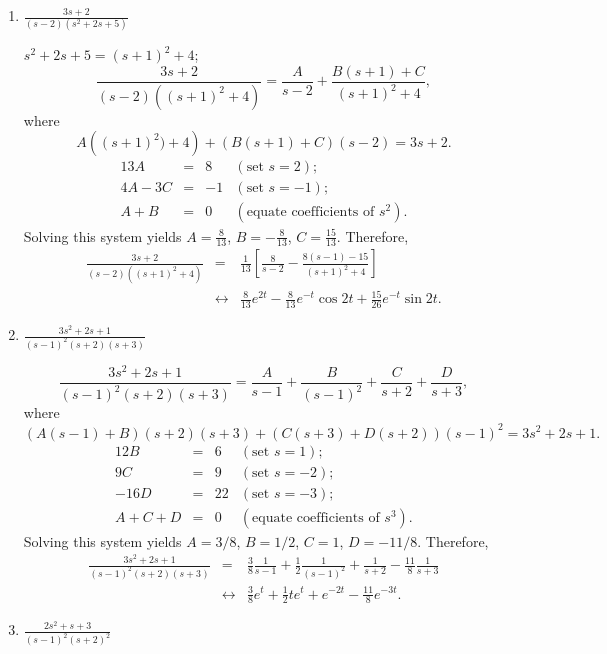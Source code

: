 \documentclass{ximera}
\begin{document}
\begin{problem}
\begin{enumerate}
    \item $\frac{3s+2}{(s-2)(s^2+2s+5)}$

\begin{solution}
$s^2+2s+5=(s+1)^2+4$;
$$
\frac{3s+2}{(s-2)((s+1)^2+4)}=\frac{A}{s-2}+
\frac{B(s+1)+C}{(s+1)^2+4},
$$
where
$$
A\left((s+1)^2)+4\right)+
\left(B(s+1)+C\right)(s-2)=3s+2.
$$
$$
\begin{array}{rcrl}
13A&=&8&(\mbox{set }s=2);\\
4A-3C&=&-1&(\mbox{set }s=-1);\\
A+B&=&0&(\mbox{equate coefficients of }s^2).
\end{array}
$$
Solving this system yields $A=\frac{8}{13}$, $B=-\frac{8}{13}$,
$C=\frac{15}{13}$. Therefore,
\begin{eqnarray*}
\frac{3s+2}{(s-2)((s+1)^2+4)}&=&\frac{1}{13}\left[\frac{8}{s-2}-
\frac{8(s-1)-15}{(s+1)^2+4}\right]\\
&\leftrightarrow&
\frac{8}{13}e^{2t}-\frac{8}{13}e^{-t}\cos 2t+\frac{15}{26}
e^{-t}\sin 2t.
\end{eqnarray*}
\end{solution}

    \item $\frac{3s^2+2s+1}{(s-1)^2(s+2)(s+3)}$

\begin{solution}
$$
\frac{3s^2+2s+1}{(s-1)^2(s+2)(s+3)}=
\frac{A}{s-1}+\frac{B}{(s-1)^2}+\frac{C}{s+2}+\frac{D}{s+3},
$$
where
$$
(A(s-1)+B)(s+2)(s+3)+(C(s+3)+D(s+2))(s-1)^2=3s^2+2s+1.
$$
$$
\begin{array}{rcrl}
12B&=&6&(\mbox{set }s=1);\\
9C&=&9& (\mbox{set }s=-2);\\
-16D&=&22&(\mbox{set }s=-3);\\
A+C+D&=&0&(\mbox{equate coefficients of }s^3).
\end{array}
$$
Solving this system yields
$A=3/8$, $B=1/2$, $C=1$, $D=-11/8$.
Therefore,
\begin{eqnarray*}
\frac{3s^2+2s+1}{(s-1)^2(s+2)(s+3)}&=&
\frac{3}{8}\frac{1}{s-1}+\frac{1}{2}\frac{1}{(s-1)^2}+\frac{1}{s+2}-\frac{11}{8}\frac{1}{s+3}\\
&\leftrightarrow&
\frac{3}{8}e^t+\frac{1}{2}te^t+e^{-2t}-\frac{11}{8}e^{-3t}.
\end{eqnarray*}
\end{solution}
    
    \item $\frac{2s^2+s+3}{(s-1)^2(s+2)^2}$


\end{enumerate}
\end{problem}
\end{document}
